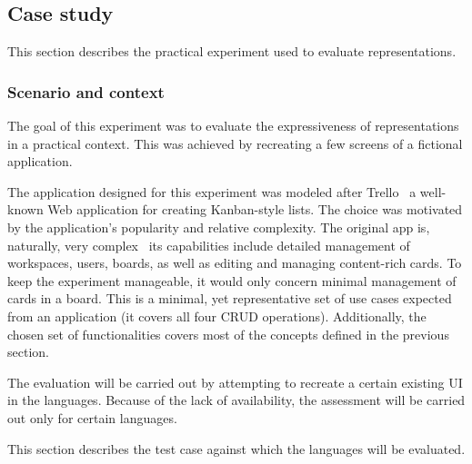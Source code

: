 \subsection{Case study}\label{subsec:case-study}
This section describes the practical experiment used to evaluate representations.

\subsubsection{Scenario and context}
The goal of this experiment was to evaluate the expressiveness of representations in a practical context.
This was achieved by recreating a few screens of a fictional application.

The application designed for this experiment was modeled after Trello \textendash\ a well-known Web application for creating Kanban-style lists.
The choice was motivated by the application's popularity and relative complexity.
The original app is, naturally, very complex \textendash\ its capabilities include detailed management of workspaces, users, boards, as well as editing and managing content-rich cards.
To keep the experiment manageable, it would only concern minimal management of cards in a board.
This is a minimal, yet representative set of use cases expected from an application (it covers all four CRUD operations).
Additionally, the chosen set of functionalities covers most of the concepts defined in the previous section.


The evaluation will be carried out by attempting to recreate a certain existing UI in the languages.
Because of the lack of availability, the assessment will be carried out only for certain languages.

This section describes the test case against which the languages will be evaluated.
